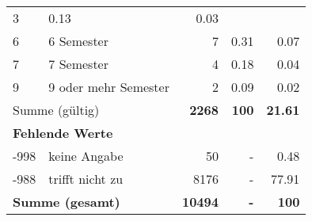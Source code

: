 \begin{longtable}{lXrrr}
       \num{3} &
       \num[round-mode=places,round-precision=2]{0.13} &
         \num[round-mode=places,round-precision=2]{0.03} \\

     6 &
     \multicolumn{1}{X}{ 6 Semester   } &


       \num{7} &
       \num[round-mode=places,round-precision=2]{0.31} &
         \num[round-mode=places,round-precision=2]{0.07} \\

     7 &
     \multicolumn{1}{X}{ 7 Semester   } &


       \num{4} &
       \num[round-mode=places,round-precision=2]{0.18} &
         \num[round-mode=places,round-precision=2]{0.04} \\

     9 &
     \multicolumn{1}{X}{ 9 oder mehr Semester   } &


       \num{2} &
       \num[round-mode=places,round-precision=2]{0.09} &
         \num[round-mode=places,round-precision=2]{0.02} \\
     \midrule
     \multicolumn{2}{l}{Summe (gültig)} &
       \textbf{\num{2268}} &
     \textbf{\num{100}} &
       \textbf{\num[round-mode=places,round-precision=2]{21.61}} \\
     \multicolumn{5}{l}{\textbf{Fehlende Werte}}\\
       -998 &
       keine Angabe &
         \num{50} &
        - &
         \num[round-mode=places,round-precision=2]{0.48} \\
       -988 &
       trifft nicht zu &
         \num{8176} &
        - &
         \num[round-mode=places,round-precision=2]{77.91} \\
     \midrule
     \multicolumn{2}{l}{\textbf{Summe (gesamt)}} &
          \textbf{\num{10494}} &
        \textbf{-} &
        \textbf{\num{100}} \\
     \bottomrule
     \end{longtable}
     
